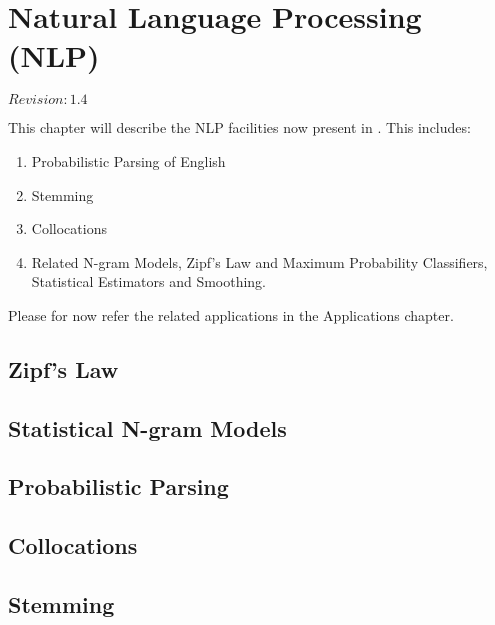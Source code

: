 \chapter{Natural Language Processing (NLP)}

$Revision: 1.4 $

This chapter will describe the NLP facilities now
present in {\marf}. This includes:

\begin{enumerate}
\item Probabilistic Parsing of English
\item Stemming
\item Collocations
\item Related N-gram Models, Zipf's Law and Maximum Probability Classifiers, Statistical Estimators and Smoothing.
\end{enumerate}

Please for now refer the related applications in the
Applications chapter.

{\todo}

\section{Zipf's Law}
{\todo}

\section{Statistical N-gram Models}
{\todo}

\section{Probabilistic Parsing}
{\todo}

\section{Collocations}
{\todo}

\section{Stemming}
{\todo}

